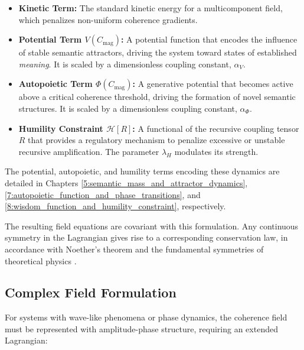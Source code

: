 \begin{itemize}

    \item \textbf{Kinetic Term:} The standard kinetic energy for a multicomponent field, which penalizes non-uniform coherence gradients.

    \item \textbf{Potential Term \(V(C_{\text{mag}})\):} A potential function that encodes the influence of stable semantic attractors, driving the system toward states of established \textit{meaning}. It is scaled by a dimensionless coupling constant, \(\alpha_V\).

    \item \textbf{Autopoietic Term \(\Phi(C_{\text{mag}})\):} A generative potential that becomes active above a critical coherence threshold, driving the formation of novel semantic structures. It is scaled by a dimensionless coupling constant, \(\alpha_\Phi\).

    \item \textbf{Humility Constraint \(\mathcal{H}[R]\):} A functional of the recursive coupling tensor \(R\) that provides a regulatory mechanism to penalize excessive or unstable recursive amplification. The parameter \(\lambda_H\) modulates its strength.

\end{itemize}

The potential, autopoietic, and humility terms encoding these dynamics are detailed in Chapters \ref{5:semantic_mass_and_attractor_dynamics}, \ref{7:autopoietic_function_and_phase_transitions}, and \ref{8:wisdom_function_and_humility_constraint}, respectively.

The resulting field equations are covariant with this formulation. Any continuous symmetry in the Lagrangian gives rise to a corresponding conservation law, in accordance with Noether's theorem and the fundamental symmetries of theoretical physics \autocite{Noether1918, Lagrange1788, Euler1744, LandauLifshitz1975, PeskinSchroeder1995, Weinberg1995}.


\subsection{Complex Field Formulation}
\label{6.2.1:complex_field_formulation}

For systems with wave-like phenomena or phase dynamics, the coherence field must be represented with amplitude-phase structure, requiring an extended Lagrangian:

